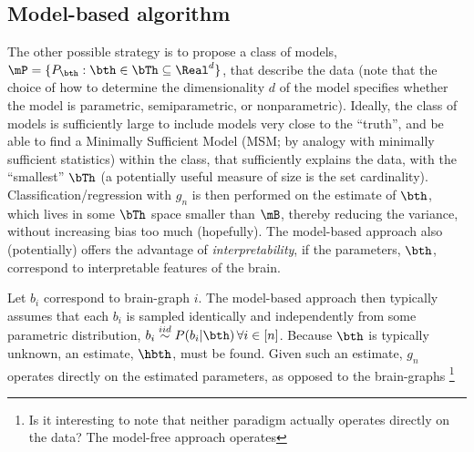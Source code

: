 \subsection{Model-based algorithm} 

\label{sub:model_based_algorithm}

The other possible strategy is to propose a class of models, $\mP=\{P_{\bth} : \bth \in \bTh \subseteq \Real^d\}$, that describe the data (note that the choice of how to determine the dimensionality $d$ of the model specifies whether the model is parametric, semiparametric, or nonparametric). Ideally, the class of models is sufficiently large to include models very close to the ``truth'', and be able to find a Minimally Sufficient Model (MSM; by analogy with minimally sufficient statistics) within the class, that sufficiently explains the data, with the ``smallest'' $\bTh$ (a potentially useful measure of size is the set cardinality). %
Classification/regression with $g_n$ is then performed on the estimate of $\bth$, which lives in some $\bTh$ space smaller than $\mB$, thereby reducing the variance, without increasing bias too much (hopefully). The model-based approach also (potentially) offers the advantage of \emph{interpretability}, if the parameters, $\bth$, correspond to interpretable features of the brain. 

Let $b_i$ correspond to brain-graph $i$. The model-based approach then typically assumes that each $b_i$ is sampled identically and independently from some parametric distribution, $b_i \overset{iid}{\sim} P(b_i | \bth) \, \forall i \in [n]$. Because $\bth$ is typically unknown, an estimate, $\hbth$, must be found. Given such an estimate, $g_n$ operates directly on the estimated parameters, as opposed to the brain-graphs \footnote{Is it interesting to note that neither paradigm actually operates directly on the data? The model-free approach operates}

